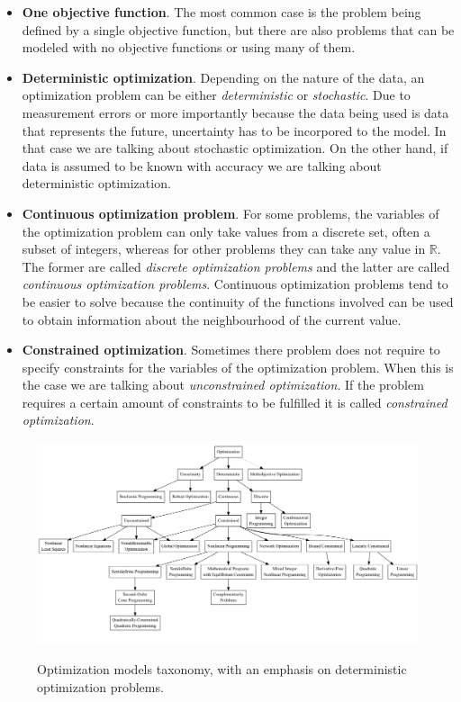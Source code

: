 \begin{itemize}
    \item \textbf{One objective function}. The most common case is the problem being defined by a single objective function, but there are also problems that can be modeled with no objective functions or using many of them.
    \item \textbf{Deterministic optimization}. Depending on the nature of the data, an optimization problem can be either \textit{deterministic} or \textit{stochastic}. Due to measurement errors or more importantly because the data being used is data that represents the future, uncertainty has to be incorpored to the model. In that case we are talking about stochastic optimization. On the other hand, if data is assumed to be known with accuracy we are talking about deterministic optimization.
    \item \textbf{Continuous optimization problem}. For some problems, the variables of the optimization problem can only take values from a discrete set, often a subset of integers, whereas for other problems they can take any value in $\mathbb{R}$. The former are called \textit{discrete optimization problems} and the latter are called \textit{continuous optimization problems}. Continuous optimization problems tend to be easier to solve because the continuity of the functions involved can be used to obtain information about the neighbourhood of the current value.
    \item \textbf{Constrained optimization}. Sometimes there problem does not require to specify constraints for the variables of the optimization problem. When this is the case we are talking about \textit{unconstrained optimization}. If the problem requires a certain amount of constraints to be fulfilled it is called \textit{constrained optimization}.
\end{itemize}

\begin{figure}[H]
    \caption[Optimization models taxonomy, with an emphasis on deterministic optimization problems.]{
        Optimization models taxonomy, with an emphasis on deterministic optimization problems.
    }
    \centering
    \includegraphics[width=\textwidth]{figs/optimizationtaxonomy.jpeg}
\label{fig:optimizationtaxonomy}
\end{figure}

